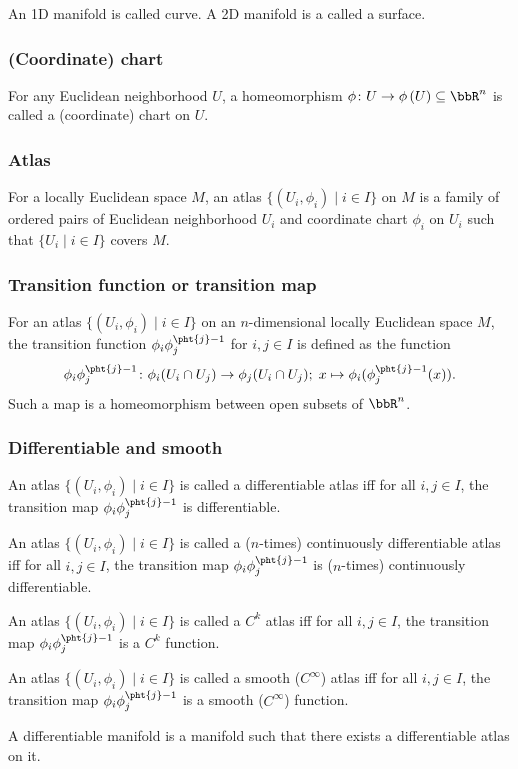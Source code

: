 \documentclass[a4paper,12pt]{article}
\begin{document}
An 1D manifold is called curve. A 2D manifold is a called a surface.
\subsubsection{(Coordinate) chart}
For any Euclidean neighborhood $U$, a homeomorphism $\phi\colon U\to\phi\left(U\right)\subseteq\bbR^n$ is called a (coordinate) chart on $U$.
\subsubsection{Atlas}
For a locally Euclidean space $M$, an atlas $\{(U_i,\phi_i)\mid i\in I\}$ on $M$ is a family of ordered pairs of Euclidean neighborhood $U_i$ and coordinate chart $\phi_i$ on $U_i$ such that $\{U_i\mid i\in I\}$ covers $M$.
\subsubsection{Transition function or transition map}
For an atlas $\{(U_i,\phi_i)\mid i\in I\}$ on an $n$-dimensional locally Euclidean space $M$, the transition function $\phi_i\phi_j^{\pht{j}-1}$ for $i,j\in I$ is defined as the function
\[\phi_i\phi_j^{\pht{j}-1}\colon\phi_i(U_i\cap U_j)\to\phi_j(U_i\cap U_j);\;x\mapsto\phi_i(\phi_j^{\pht{j}-1}(x)).\]
Such a map is a homeomorphism between open subsets of $\bbR^n$.
\subsubsection{Differentiable and smooth}
An atlas $\{(U_i,\phi_i)\mid i\in I\}$ is called a differentiable atlas iff for all $i,j\in I$, the transition map $\phi_i\phi_j^{\pht{j}-1}$ is differentiable.

An atlas $\{(U_i,\phi_i)\mid i\in I\}$ is called a ($n$-times) continuously differentiable atlas iff for all $i,j\in I$, the transition map $\phi_i\phi_j^{\pht{j}-1}$ is ($n$-times) continuously differentiable.

An atlas $\{(U_i,\phi_i)\mid i\in I\}$ is called a $C^k$ atlas iff for all $i,j\in I$, the transition map $\phi_i\phi_j^{\pht{j}-1}$ is a $C^k$ function.

An atlas $\{(U_i,\phi_i)\mid i\in I\}$ is called a smooth ($C^\infty$) atlas iff for all $i,j\in I$, the transition map $\phi_i\phi_j^{\pht{j}-1}$ is a smooth ($C^\infty$) function.

A differentiable manifold is a manifold such that there exists a differentiable atlas on it.
\end{document}
